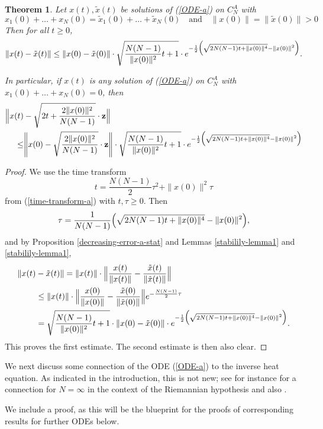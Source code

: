 \documentclass[reqno]{amsart}
\theoremstyle{plain}
\newtheorem{theorem}{Theorem}[section]
\theoremstyle{definition}
\numberwithin{equation}{section}
\begin{document}
\begin{theorem}\label{final-convergence-a}
  Let  $x(t),\tilde x(t)$ be solutions of  (\ref{ODE-a}) on $C_N^A$ with
  $$x_1(0)+\ldots+ x_N(0)=\tilde x_1(0)+\ldots+ \tilde x_N(0) \quad\text{and}\quad
\|x(0)\|=\|\tilde x(0)\|>0$$
Then for all $t\ge0$,
$$\|x(t)-\tilde x(t)\|\le
\|x(0)-\tilde x(0)\|\cdot\sqrt{\frac{N(N-1)}{\|x(0)\|^2}t +1}\cdot  e^{- \frac{1}{2}  \Bigl(\sqrt{ 2N(N-1)t +\|x(0)\|^4}- \|x(0)\|^2\Bigr) }.$$

In particular, if  $x(t)$ is any solution   of   (\ref{ODE-a}) on $C_N^A$ with  $x_1(0)+\ldots+x_N(0)=0$, then
\begin{align}
  \Bigl\|x(t)&-\sqrt{2t+\frac{2\|x(0)\|^2}{N(N-1)}}\cdot  {\bf z }\Bigr\|\\
  \le&\Biggl\|x(0)-\sqrt{\frac{2\|x(0)\|^2}{N(N-1)}}\cdot  {\bf z }
\Biggr\|\cdot
\sqrt{\frac{N(N-1)}{\|x(0)\|^2}t +1}\cdot  e^{- \frac{1}{2}   \Bigl(\sqrt{ 2N(N-1)t +\|x(0)\|^4}- \|x(0)\|^2\Bigr) }
\notag\end{align}
\end{theorem}

\begin{proof} We use the time transform
  $$t=\frac{ N(N-1)}{2}\tau^2+ \|x(0)\|^2\tau$$
  from (\ref{time-transform-a}) with $t,\tau\ge 0$. Then
  $$\tau = \frac{1}{N(N-1)}\Bigl(\sqrt{ 2N(N-1)t +\|x(0)\|^4}- \|x(0)\|^2\Bigr),$$
  and by Proposition \ref{decreasing-error-a-stat} and Lemmas  \ref{stabilily-lemma1} and \ref{stabilily-lemma1},
  \begin{align}
    \|x(t)&-\tilde x(t)\|= \|x(t)\|\cdot
    \Bigl\| \frac{x(t)}{\|x(t)\|}- \frac{\tilde x(t)}{\|\tilde x(t)\|}\Bigr\|  \notag\\
  &\le\|x(t)\|\cdot \Bigl\| \frac{x(0)}{\|x(0)\|}- \frac{\tilde x(0)}{\|\tilde x(0)\|}\Bigr\|
 e^{- \frac{N(N-1)}{2}  \tau}\notag\\
&= \sqrt{\frac{N(N-1)}{\|x(0)\|^2}t +1}\cdot \|x(0)-\tilde x(0)\|\cdot  e^{- \frac{1}{2} \Bigl(\sqrt{ 2N(N-1)t+\|x(0)\|^4}- \|x(0)\|^2\Bigr) }.
 \notag \end{align}
This proves the first estimate. The second estimate is then also clear. 
  \end{proof}

We next discuss some connection  of the ODE (\ref{ODE-a}) to the inverse heat equation.
As indicated in the introduction, this is not new; see for instance \cite{CSL, RT} for a connection for $N=\infty$
in the context of the Riemannian hypothesis and also \cite{HHJK}.

We include a proof, as this will be the blueprint for
the proofs of corresponding results for further ODEs below.
\end{document}
